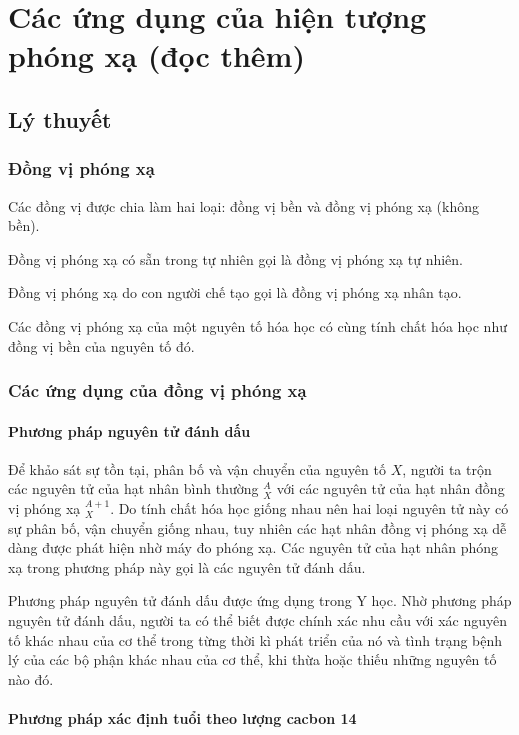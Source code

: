 
\chapter[Các ứng dụng của hiện tượng phóng xạ (đọc thêm)]{Các ứng dụng của hiện tượng phóng xạ (đọc thêm)}
\section{Lý thuyết}

\subsection{Đồng vị phóng xạ}
Các đồng vị được chia làm hai loại: đồng vị bền và đồng vị phóng xạ (không bền).

Đồng vị phóng xạ có sẵn trong tự nhiên gọi là đồng vị phóng xạ tự nhiên.

Đồng vị phóng xạ do con người chế tạo gọi là đồng vị phóng xạ nhân tạo.

Các đồng vị phóng xạ của một nguyên tố hóa học có cùng tính chất hóa học như đồng vị bền của nguyên tố đó.
\subsection{Các ứng dụng của đồng vị phóng xạ}

\subsubsection{Phương pháp nguyên tử đánh dấu}
Để khảo sát sự tồn tại, phân bố và vận chuyển của nguyên tố $X$, người ta trộn các nguyên tử của hạt nhân bình thường $^A_X$ với các nguyên tử của hạt nhân đồng vị phóng xạ $^{A+1}_X$. Do tính chất hóa học giống nhau nên hai loại nguyên tử này có sự phân bố, vận chuyển giống nhau, tuy nhiên các hạt nhân đồng vị phóng xạ dễ dàng được phát hiện nhờ máy đo phóng xạ. Các nguyên tử của hạt nhân phóng xạ trong phương pháp này gọi là các nguyên tử đánh dấu. 

Phương pháp nguyên tử đánh dấu được ứng dụng trong Y học. Nhờ phương pháp nguyên tử đánh dấu, người ta có thể biết được chính xác nhu cầu với xác nguyên tố khác nhau của cơ thể trong từng thời kì phát triển của nó và tình trạng bệnh lý của các bộ phận khác nhau của cơ thể, khi thừa hoặc thiếu những nguyên tố nào đó.

\subsubsection{Phương pháp xác định tuổi theo lượng cacbon 14}

